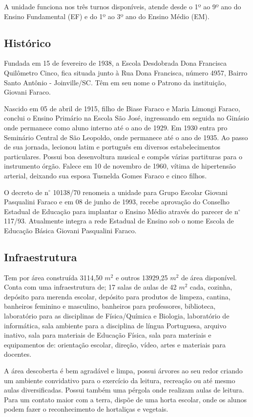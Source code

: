 A unidade funciona nos três turnos disponíveis, atende desde o 1º ao 9º ano do Ensino Fundamental (EF) e do 1º ao 3º ano do Ensino Médio (EM).

\subsection{Histórico}
Fundada em 15 de fevereiro de 1938, a Escola Desdobrada Dona Francisca Quilômetro Cinco, fica situada junto à Rua Dona Francisca, número 4957, Bairro Santo Antônio -  Joinville/SC. Têm em seu nome o Patrono da instituição, Giovani Faraco.

Nascido em 05 de abril de 1915, filho de Biase Faraco e Maria Limongi Faraco, conclui o Ensino Primário na Escola São José, ingressando em seguida no Ginásio onde permanece como aluno interno até o ano de 1929. Em 1930 entra pro Seminário Central de São Leopoldo, onde permanece até o ano de 1935. Ao passo de sua jornada, lecionou latim e português em diversos estabelecimentos particulares. Possui boa desenvoltura musical e compôs várias partituras para o instrumento órgão. Falece em 10 de novembro de 1960, vítima de hipertensão arterial, deixando sua esposa Tusnelda Gomes Faraco e cinco filhos.

O decreto de n$^\circ$ 10138/70 renomeia a unidade para Grupo Escolar Giovani Pasqualini Faraco e em 08 de junho de 1993, recebe aprovação do Conselho Estadual de Educação para implantar o Ensino Médio através do parecer de n$^\circ$ 117/93. Atualmente integra a rede Estadual de Ensino sob o nome Escola de Educação Básica Giovani Pasqualini Faraco.

\subsection{Infraestrutura}
Tem por área construída 3114,50 $m^2$ e outros 13929,25 $m^2$ de área disponível. Conta com uma infraestrutura de; 17 salas de aulas  de 42 $m^2$ cada, cozinha, depósito para merenda escolar, depósito para produtos de limpeza, cantina, banheiros feminino e masculino, banheiros para professores, biblioteca, laboratório para as disciplinas de Física/Química e Biologia, laboratório de informática, sala ambiente para a disciplina de língua Portuguesa, arquivo inativo, sala para materiais de Educação Física, sala para materiais e equipamentos de: orientação escolar, direção, vídeo, artes e materiais para docentes.

A área descoberta é bem agradável e limpa, possui árvores ao seu redor criando um ambiente convidativo para o exercício da leitura, recreação ou até mesmo aulas diversificadas. Possui também uma pérgola onde realizam aulas de leitura. Para um contato maior com a terra, dispõe de uma horta escolar, onde os alunos podem fazer o reconhecimento de hortaliças e vegetais.

